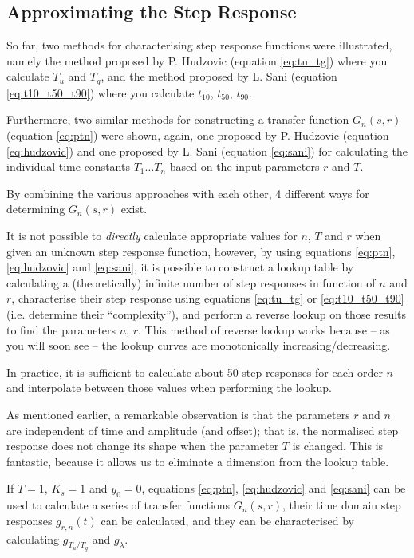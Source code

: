 \subsection{Approximating the Step Response}

So far, two methods for characterising step response functions were illustrated,
namely the method proposed  by  P.  Hudzovic (equation \ref{eq:tu_tg}) where you
calculate  $T_u$  and  $T_g$,  and  the  method  proposed by L.  Sani  (equation
\ref{eq:t10_t50_t90})   where  you  calculate  $t_{10}$,   $t_{50}$,   $t_{90}$.

Furthermore, two similar methods for constructing a transfer function $G_n(s,r)$
(equation \ref{eq:ptn}) were shown, again, one proposed by P. Hudzovic (equation
\ref{eq:hudzovic})  and  one  proposed by L. Sani (equation  \ref{eq:sani})  for
calculating the individual time constants $T_1 \ldots T_n$ based  on  the  input
parameters $r$ and $T$.

By  combining  the  various  approaches  with each other, 4 different  ways  for
determining $G_n(s,r)$ exist.

It  is  not  possible to \textit{directly} calculate appropriate values for $n$,
$T$  and $r$ when given an unknown step response  function,  however,  by  using
equations \ref{eq:ptn},  \ref{eq:hudzovic}  and \ref{eq:sani}, it is possible to
construct  a  lookup table by calculating a (theoretically) infinite  number  of
step responses in function of $n$  and  $r$,  characterise  their  step response
using  equations \ref{eq:tu_tg} or \ref{eq:t10_t50_t90}  (i.e.  determine  their
``complexity''), and perform a  reverse  lookup  on  those  results  to find the
parameters $n$, $r$.  This method of reverse lookup works because -- as you will
soon  see  --  the   lookup   curves  are  monotonically  increasing/decreasing.

In practice, it  is  sufficient  to  calculate  about 50 step responses for each
order  $n$  and  interpolate  between  those values when performing the  lookup.

As mentioned earlier, a remarkable  observation  is  that the parameters $r$ and
$n$ are independent of time and amplitude (and offset); that is,  the normalised
step response does not change its  shape when the parameter $T$ is changed. This
is fantastic,  because  it  allows  us  to eliminate a dimension from the lookup
table.

If $T=1$, $K_s=1$  and  $y_0=0$,  equations  \ref{eq:ptn}, \ref{eq:hudzovic} and
\ref{eq:sani}  can  be   used  to  calculate  a  series  of  transfer  functions
$G_n(s,r)$, their time domain step responses $g_{r,n}(t)$ can be calculated, and
they  can  be  characterised  by  calculating $g_{T_u/T_g}$  and  $g_{\lambda}$.

